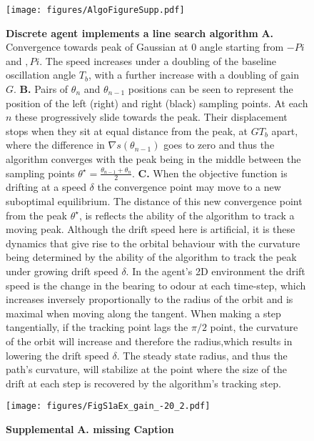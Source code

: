 \documentclass[10pt,a4paper]{article}
\begin{document}
\begin{figure}[!ht]
\begin{center}
\texttt{[image: figures/AlgoFigureSupp.pdf]}
\caption{{\bf Discrete agent implements a line search algorithm} {\bf A.} Convergence towards peak of Gaussian at 0 angle starting from $-Pi$ and $,Pi$. The speed increases under a doubling of the baseline oscillation angle $T_b$, with a further increase with a doubling of gain $G$.    
{\bf B.} Pairs of $\theta_n$ and $\theta_{n-1}$ positions can be seen to represent the position of the left (right) and right (black) sampling points. At each $n$ these progressively slide towards the peak. Their displacement stops when they sit at equal distance from the peak, at $G T_b$ apart, where the difference in $\nabla s(\theta_{n-1})$ goes to zero and thus the algorithm converges with the peak being in the middle between the sampling points $\theta^{\star} =\frac{\theta_{n-1}+\theta_n}{2}$.
{\bf C.} When the objective function is drifting at a speed $\delta$ the convergence point may move to a new suboptimal equilibrium. The distance of this new convergence point from the peak $\theta^{\star}$, is reflects the ability of the algorithm to track a moving peak. Although the drift speed here is artificial, it is these dynamics that give rise to the orbital behaviour with the curvature being determined by the ability of the algorithm to track the peak under growing drift speed $\delta$. 
In the agent's 2D environment the drift speed is the change in the bearing to odour at each time-step, which increases inversely proportionally to the radius of the orbit and is maximal when moving along the tangent. When making a step tangentially, if the tracking point lags the $\pi/2$ point, the curvature of the orbit will increase and therefore the radius,which results in lowering the drift speed $\delta$.   
 The steady state radius, and thus the path's curvature, will stabilize at the point where the size of the drift at each step is recovered by the algorithm's tracking step. 
\label{fig:AlgoAnalysis}}
\end{center}
\end{figure}


\begin{figure}[!ht]
\begin{center}
\texttt{[image: figures/FigS1aEx\_gain\_-20\_2.pdf]}
\caption{{\bf Supplemental} {\bf A. missing Caption} 
\label{fig:FigS1a}}
\end{center}
\end{figure}
\end{document}
